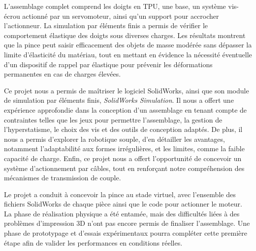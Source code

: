 \documentclass[a4paper, 11pt]{report}
\begin{document}
        L’assemblage complet comprend les doigts en TPU, une base, un système vis-écrou actionné par un servomoteur, ainsi qu’un support pour accrocher l'actionneur. La simulation par éléments finis a permis de vérifier le comportement élastique des doigts sous diverses charges. Les résultats montrent que la pince peut saisir efficacement des objets de masse modérée sans dépasser la limite d’élasticité du matériau, tout en mettant en évidence la nécessité éventuelle d’un dispositif de rappel par élastique pour prévenir les déformations permanentes en cas de charges élevées.

        Ce projet nous a permis de maîtriser le logiciel SolidWorks, ainsi que son module de simulation par éléments finis, \textit{SolidWorks Simulation}. Il nous a offert une expérience approfondie dans la conception d’un assemblage en tenant compte de contraintes telles que les jeux pour permettre l’assemblage, la gestion de l’hyperstatisme, le choix des vis et des outils de conception adaptés. De plus, il nous a permis d’explorer la robotique souple, d’en détailler les avantages, notamment l’adaptabilité aux formes irrégulières, et les limites, comme la faible capacité de charge. Enfin, ce projet nous a offert l’opportunité de concevoir un système d’actionnement par câbles, tout en renforçant notre compréhension des mécanismes de transmission de couple.

        Le projet a conduit à concevoir la pince au stade virtuel, avec l’ensemble des fichiers SolidWorks de chaque pièce ainsi que le code pour actionner le moteur. La phase de réalisation physique a été entamée, mais des difficultés liées à des problèmes d’impression 3D n’ont pas encore permis de finaliser l’assemblage. Une phase de prototypage et d’essais expérimentaux pourra compléter cette première étape afin de valider les performances en conditions réelles.



\end{document}
